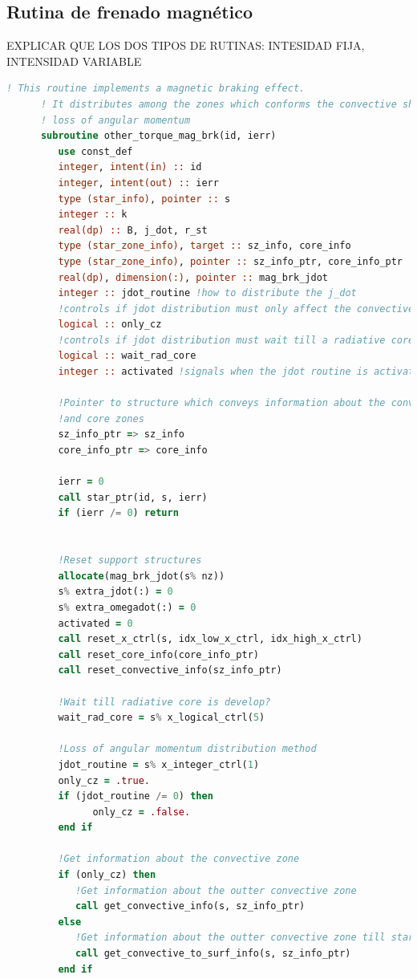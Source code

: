 \subsection{Rutina de frenado magnético}
EXPLICAR QUE LOS DOS TIPOS DE RUTINAS: INTESIDAD FIJA, INTENSIDAD VARIABLE
\begin{lstlisting}[language=Fortran, caption={Rutina de frenado magnético.}, label={lst:torque_mb_hook}]
      ! This routine implements a magnetic braking effect.
      ! It distributes among the zones which conforms the convective shell the
      ! loss of angular momentum
      subroutine other_torque_mag_brk(id, ierr)
         use const_def
         integer, intent(in) :: id
         integer, intent(out) :: ierr
         type (star_info), pointer :: s
         integer :: k
         real(dp) :: B, j_dot, r_st
         type (star_zone_info), target :: sz_info, core_info
         type (star_zone_info), pointer :: sz_info_ptr, core_info_ptr
         real(dp), dimension(:), pointer :: mag_brk_jdot
         integer :: jdot_routine !how to distribute the j_dot
         !controls if jdot distribution must only affect the convective zone
         logical :: only_cz
         !controls if jdot distribution must wait till a radiative core is develop
         logical :: wait_rad_core          
         integer :: activated !signals when the jdot routine is activated
         
         !Pointer to structure which conveys information about the convectice
         !and core zones
         sz_info_ptr => sz_info
         core_info_ptr => core_info

         ierr = 0
         call star_ptr(id, s, ierr)
         if (ierr /= 0) return


         !Reset support structures
         allocate(mag_brk_jdot(s% nz))
         s% extra_jdot(:) = 0
         s% extra_omegadot(:) = 0
         activated = 0
         call reset_x_ctrl(s, idx_low_x_ctrl, idx_high_x_ctrl)
         call reset_core_info(core_info_ptr)
         call reset_convective_info(sz_info_ptr)

         !Wait till radiative core is develop?
         wait_rad_core = s% x_logical_ctrl(5)

         !Loss of angular momentum distribution method
         jdot_routine = s% x_integer_ctrl(1)
         only_cz = .true.
         if (jdot_routine /= 0) then
               only_cz = .false.
         end if

         !Get information about the convective zone
         if (only_cz) then
            !Get information about the outter convective zone
            call get_convective_info(s, sz_info_ptr)
         else
            !Get information about the outter convective zone till star surface
            call get_convective_to_surf_info(s, sz_info_ptr)
         end if


\end{lstlisting}
